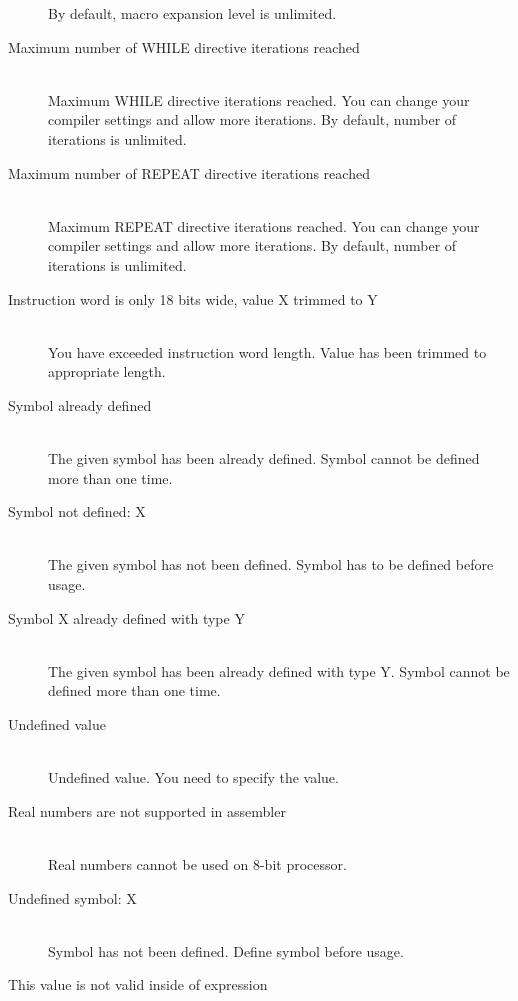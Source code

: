 \begin{description}
                    By default, macro expansion level is unlimited.
                    \item[Maximum number of WHILE directive iterations reached ] \hfill \\
                    Maximum WHILE directive iterations reached. You can change your compiler settings and allow more iterations.
                    By default, number of iterations is unlimited.
                    \item[Maximum number of REPEAT directive iterations reached ] \hfill \\
                    Maximum REPEAT directive iterations reached. You can change your compiler settings and allow more iterations.
                    By default, number of iterations is unlimited.
                    \item[Instruction word is only 18 bits wide, value X trimmed to Y ] \hfill \\
                    You have exceeded instruction word length. Value has been trimmed to  appropriate length.
                    \item[Symbol already defined] \hfill \\
                    The given symbol has been already defined. Symbol cannot be defined more than one time.
                    \item[Symbol not defined: X ] \hfill \\
                    The given symbol has not been defined. Symbol has to be defined before usage.
                    \item[Symbol X already defined with type Y] \hfill \\
                    The given symbol has been already defined with type Y. Symbol cannot be defined more than one time.
                    \item[Undefined value ] \hfill \\
                    Undefined value. You need to specify the value.                       %
                    \item[Real numbers are not supported in assembler ] \hfill \\
                    Real numbers cannot be used on 8-bit processor.
                    \item[Undefined symbol: X ] \hfill \\
                    Symbol has not been defined. Define symbol before usage.
                    \item[This value is not valid inside of expression ] \hfill \\         %

\end{description}
